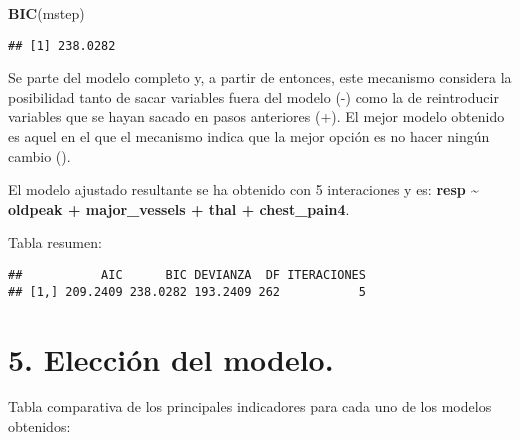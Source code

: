 \documentclass[]{article}
\newenvironment{Shaded}{\begin{snugshade}}{\end{snugshade}}
\newcommand{\KeywordTok}[1]{\textcolor[rgb]{0.13,0.29,0.53}{\textbf{#1}}}
\newcommand{\DataTypeTok}[1]{\textcolor[rgb]{0.13,0.29,0.53}{#1}}
\newcommand{\OperatorTok}[1]{\textcolor[rgb]{0.81,0.36,0.00}{\textbf{#1}}}
\newcommand{\NormalTok}[1]{#1}
\begin{document}
\begin{Shaded}
\begin{Highlighting}[]
\KeywordTok{BIC}\NormalTok{(mstep)}
\end{Highlighting}
\end{Shaded}

\begin{verbatim}
## [1] 238.0282
\end{verbatim}

Se parte del modelo completo y, a partir de entonces, este mecanismo
considera la posibilidad tanto de sacar variables fuera del modelo (-)
como la de reintroducir variables que se hayan sacado en pasos
anteriores (+). El mejor modelo obtenido es aquel en el que el mecanismo
indica que la mejor opción es no hacer ningún cambio ().

El modelo ajustado resultante se ha obtenido con 5 interaciones y es:
\textbf{resp \textasciitilde{} oldpeak + major\_vessels + thal +
chest\_pain4}.

Tabla resumen:

\begin{Shaded}
\end{Shaded}

\begin{verbatim}
##           AIC      BIC DEVIANZA  DF ITERACIONES
## [1,] 209.2409 238.0282 193.2409 262           5
\end{verbatim}

\section{5. Elección del modelo.}\label{eleccion-del-modelo.}

Tabla comparativa de los principales indicadores para cada uno de los
modelos obtenidos:
\end{document}
